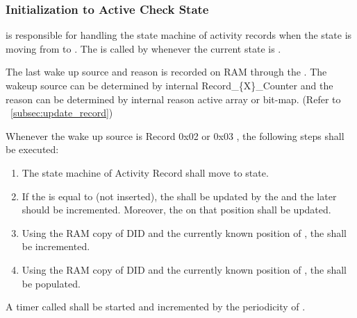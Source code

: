 \subsubsection{Initialization to Active Check State}

{ is responsible for handling the state machine of activity records when the state is moving from  to . 
The  is called by  whenever the current state is .}
{}

{The last wake up source and reason is recorded on RAM through the . The wakeup source can be determined by internal Record_\{X\}_Counter and the reason can be determined by internal reason active array or bit-map. (Refer to ~\ref{subsec:update_record})}
{  }

{Whenever the wake up source is Record 0x02 or 0x03 , the following steps shall be executed:
\begin{enumerate}
	\item The state machine of Activity Record shall move to  state.
	\item If the  is equal to  (not inserted), the  shall be updated by the  and the later should be incremented. Moreover, the  on that position shall be updated.
	\item Using the RAM copy of DID and the currently known position of , the  shall be incremented.
	\item Using the RAM copy of DID and the currently known position of , the  shall be populated. 
\end{enumerate}
}
{}

{A timer called  shall be started and incremented by the periodicity of .}
{}

